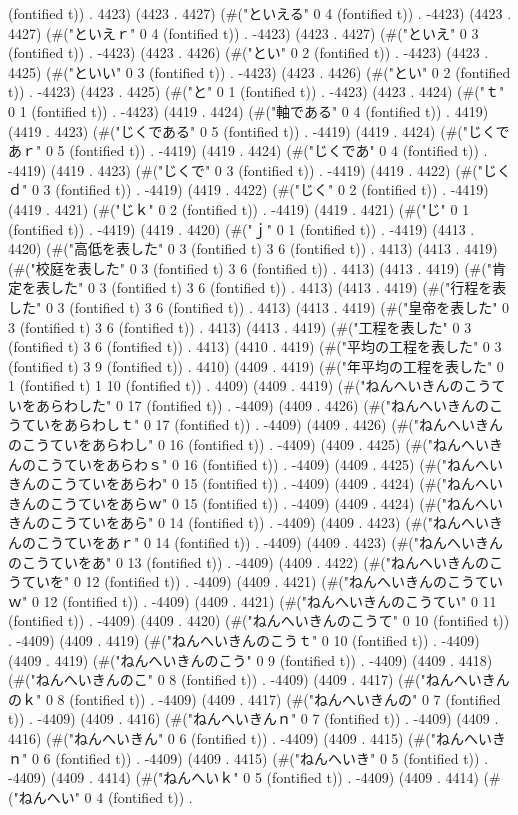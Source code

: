 (fontified t)) . 4423) (4423 . 4427) (#("といえる" 0 4 (fontified t)) . -4423) (4423 . 4427) (#("といえｒ" 0 4 (fontified t)) . -4423) (4423 . 4427) (#("といえ" 0 3 (fontified t)) . -4423) (4423 . 4426) (#("とい" 0 2 (fontified t)) . -4423) (4423 . 4425) (#("といい" 0 3 (fontified t)) . -4423) (4423 . 4426) (#("とい" 0 2 (fontified t)) . -4423) (4423 . 4425) (#("と" 0 1 (fontified t)) . -4423) (4423 . 4424) (#("ｔ" 0 1 (fontified t)) . -4423) (4419 . 4424) (#("軸である" 0 4 (fontified t)) . 4419) (4419 . 4423) (#("じくである" 0 5 (fontified t)) . -4419) (4419 . 4424) (#("じくであｒ" 0 5 (fontified t)) . -4419) (4419 . 4424) (#("じくであ" 0 4 (fontified t)) . -4419) (4419 . 4423) (#("じくで" 0 3 (fontified t)) . -4419) (4419 . 4422) (#("じくｄ" 0 3 (fontified t)) . -4419) (4419 . 4422) (#("じく" 0 2 (fontified t)) . -4419) (4419 . 4421) (#("じｋ" 0 2 (fontified t)) . -4419) (4419 . 4421) (#("じ" 0 1 (fontified t)) . -4419) (4419 . 4420) (#("ｊ" 0 1 (fontified t)) . -4419) (4413 . 4420) (#("高低を表した" 0 3 (fontified t) 3 6 (fontified t)) . 4413) (4413 . 4419) (#("校庭を表した" 0 3 (fontified t) 3 6 (fontified t)) . 4413) (4413 . 4419) (#("肯定を表した" 0 3 (fontified t) 3 6 (fontified t)) . 4413) (4413 . 4419) (#("行程を表した" 0 3 (fontified t) 3 6 (fontified t)) . 4413) (4413 . 4419) (#("皇帝を表した" 0 3 (fontified t) 3 6 (fontified t)) . 4413) (4413 . 4419) (#("工程を表した" 0 3 (fontified t) 3 6 (fontified t)) . 4413) (4410 . 4419) (#("平均の工程を表した" 0 3 (fontified t) 3 9 (fontified t)) . 4410) (4409 . 4419) (#("年平均の工程を表した" 0 1 (fontified t) 1 10 (fontified t)) . 4409) (4409 . 4419) (#("ねんへいきんのこうていをあらわした" 0 17 (fontified t)) . -4409) (4409 . 4426) (#("ねんへいきんのこうていをあらわしｔ" 0 17 (fontified t)) . -4409) (4409 . 4426) (#("ねんへいきんのこうていをあらわし" 0 16 (fontified t)) . -4409) (4409 . 4425) (#("ねんへいきんのこうていをあらわｓ" 0 16 (fontified t)) . -4409) (4409 . 4425) (#("ねんへいきんのこうていをあらわ" 0 15 (fontified t)) . -4409) (4409 . 4424) (#("ねんへいきんのこうていをあらｗ" 0 15 (fontified t)) . -4409) (4409 . 4424) (#("ねんへいきんのこうていをあら" 0 14 (fontified t)) . -4409) (4409 . 4423) (#("ねんへいきんのこうていをあｒ" 0 14 (fontified t)) . -4409) (4409 . 4423) (#("ねんへいきんのこうていをあ" 0 13 (fontified t)) . -4409) (4409 . 4422) (#("ねんへいきんのこうていを" 0 12 (fontified t)) . -4409) (4409 . 4421) (#("ねんへいきんのこうていｗ" 0 12 (fontified t)) . -4409) (4409 . 4421) (#("ねんへいきんのこうてい" 0 11 (fontified t)) . -4409) (4409 . 4420) (#("ねんへいきんのこうて" 0 10 (fontified t)) . -4409) (4409 . 4419) (#("ねんへいきんのこうｔ" 0 10 (fontified t)) . -4409) (4409 . 4419) (#("ねんへいきんのこう" 0 9 (fontified t)) . -4409) (4409 . 4418) (#("ねんへいきんのこ" 0 8 (fontified t)) . -4409) (4409 . 4417) (#("ねんへいきんのｋ" 0 8 (fontified t)) . -4409) (4409 . 4417) (#("ねんへいきんの" 0 7 (fontified t)) . -4409) (4409 . 4416) (#("ねんへいきんｎ" 0 7 (fontified t)) . -4409) (4409 . 4416) (#("ねんへいきん" 0 6 (fontified t)) . -4409) (4409 . 4415) (#("ねんへいきｎ" 0 6 (fontified t)) . -4409) (4409 . 4415) (#("ねんへいき" 0 5 (fontified t)) . -4409) (4409 . 4414) (#("ねんへいｋ" 0 5 (fontified t)) . -4409) (4409 . 4414) (#("ねんへい" 0 4 (fontified t)) . 